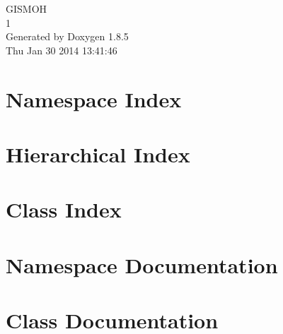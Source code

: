 \documentclass[twoside]{book}
\newcommand{\clearemptydoublepage}{%
  \newpage{\pagestyle{empty}\cleardoublepage}%
}
\begin{document}
\hypersetup{pageanchor=false}
\begin{titlepage}
\vspace*{7cm}
\begin{center}%
{\Large G\-I\-S\-M\-O\-H \\[1ex]\large 1 }\\
\vspace*{1cm}
{\large Generated by Doxygen 1.8.5}\\
\vspace*{0.5cm}
{\small Thu Jan 30 2014 13:41:46}\\
\end{center}
\end{titlepage}
\clearemptydoublepage
\tableofcontents
\clearemptydoublepage
{}
\hypersetup{pageanchor=true}

\chapter{Namespace Index}

\chapter{Hierarchical Index}

\chapter{Class Index}

\chapter{Namespace Documentation}




\chapter{Class Documentation}


























\newpage
{}
{}
\printindex
\end{document}
